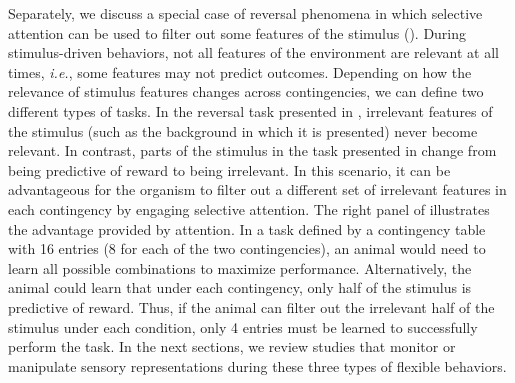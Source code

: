 Separately, we discuss a special case of reversal phenomena in which selective attention can be used to filter out some features of the stimulus (\fig{\FeatureRelevance}).
%
During stimulus-driven behaviors, not all features of the environment are relevant at all times, \emph{i.e.}, some features may not predict outcomes. Depending on how the relevance of stimulus features changes across contingencies, we can define two different types of tasks. In the reversal task presented in \fig{\StimAction}, irrelevant features of the stimulus (such as the background in which it is presented) never become relevant. In contrast, parts of the stimulus in the task presented in \fig{\FeatureRelevance} change from being predictive of reward to being irrelevant. In this scenario, it can be advantageous for the organism to filter out a different set of irrelevant features in each contingency by engaging selective attention. The right panel of \fig{\FeatureRelevance} illustrates the advantage provided by attention. In a task defined by a contingency table with 16 entries (8 for each of the two contingencies), an animal would need to learn all possible combinations to maximize performance. Alternatively, the animal could learn that under each contingency, only half of the stimulus is predictive of reward. Thus, if the animal can filter out the irrelevant half of the stimulus under each condition, only 4 entries must be learned to successfully perform the task. In the next sections, we review studies that monitor or manipulate sensory representations during these three types of flexible behaviors.

